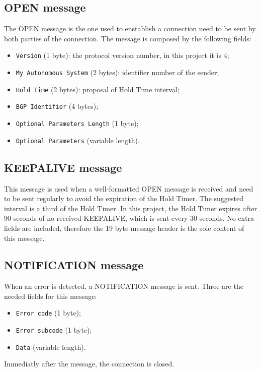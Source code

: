 \subsection{OPEN message}
The OPEN message is the one used to enstablish a connection need to be sent by both parties of the connection.
The message is composed by the following fields:
\begin{itemize}
    \item \texttt{Version} (1 byte): the protocol version number, in this project it is 4;
    \item \texttt{My Autonomous System} (2 bytes): identifier number of the sender;
    \item \texttt{Hold Time} (2 bytes): proposal of Hold Time interval;
    \item \texttt{BGP Identifier} (4 bytes);
    \item \texttt{Optional Parameters Length} (1 byte);
    \item \texttt{Optional Parameters} (variable length).
\end{itemize}


\subsection{KEEPALIVE message}
This message is used when a well-formatted OPEN message is received and need to be sent regularly to avoid the expiration of the Hold Timer. The suggested interval is a third of the Hold Timer. In this project, the Hold Timer expires after 90 seconds of no received KEEPALIVE, which is sent every 30 seconds. No extra fields are included, therefore the 19 byte message header is the sole content of this message.


\subsection{NOTIFICATION message}
When an error is detected, a NOTIFICATION message is sent. Three are the needed fields for this message:
\begin{itemize}
    \item \texttt{Error code} (1 byte);
    \item \texttt{Error subcode} (1 byte);
    \item \texttt{Data} (variable length).
\end{itemize}
Immediatly after the message, the connection is closed.

